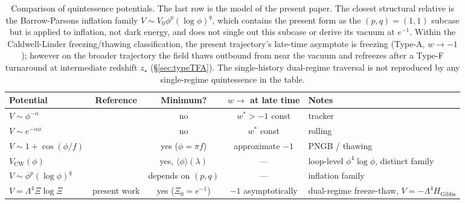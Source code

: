 \documentclass[11pt,reqno]{amsart}
\theoremstyle{plain}
\theoremstyle{definition}
\theoremstyle{remark}
\newcommand{\Gibbs}{\mathrm{Gibbs}}
\begin{document}
\begin{table}[h]
\small
\begin{tabular}{l|c|c|c|l}
Potential & Reference & Minimum? & $w \to$ at late time & Notes\\
\hline
$V \sim \phi^{-\alpha}$ & \cite{RatraPeebles1988} & no & $w^{*} > -1$ const & tracker\\
$V \sim e^{-\alpha\phi}$ & \cite{Wetterich1988} & no & $w^{*}$ const & rolling\\
$V \sim 1 + \cos(\phi/f)$ & \cite{Frieman1995} & yes ($\phi = \pi f$) & approximate $-1$ & PNGB / thawing\\
$V_\text{CW}(\phi)$ & \cite{ColemanWeinberg1973} & yes, $\langle\phi\rangle(\lambda)$ & --- & loop-level $\phi^{4}\log\phi$, distinct family\\
$V \sim \phi^{p}(\log\phi)^{q}$ & \cite{BarrowParsons1995} & depends on $(p,q)$ & --- & inflation family\\
$\boxed{V = \Lambda^{4}\Xi\log\Xi}$ & present work & yes ($\Xi_0 = e^{-1}$) & $-1$ asymptotically & dual-regime freeze-thaw, $V = -\Lambda^{4} H_{\Gibbs}$
\end{tabular}
\caption{Comparison of quintessence potentials. The last row is the
model of the present paper. The closest structural relative is the
Barrow-Parsons inflation family \cite{BarrowParsons1995}
$V \sim V_0 \phi^{p}(\log\phi)^{q}$, which contains the present form as
the $(p,q) = (1,1)$ subcase but is applied to inflation, not dark energy,
and does not single out this subcase or derive its vacuum at $e^{-1}$.
Within the Caldwell-Linder \cite{CaldwellLinder2005} freezing/thawing
classification, the present trajectory's late-time asymptote is
freezing (Type-A, $w \to -1$); however on the broader trajectory the
field thaws outbound from near the vacuum and refreezes after a
Type-F turnaround at intermediate redshift $z_\star$ (\S\ref{sec:typeTFA}).
The single-history dual-regime traversal is not reproduced by any
single-regime quintessence in the table.}
\label{tab:compare}
\end{table}
\end{document}
